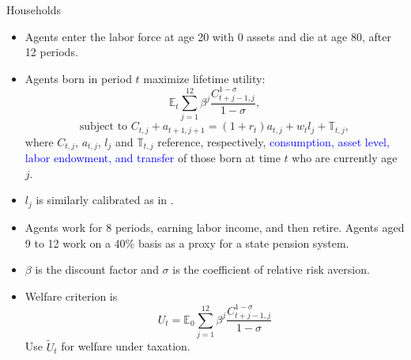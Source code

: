 \documentclass[aspectratio=1610]{beamer}
\newcommand{\blup}[1]{\textcolor{uzhgreydark}{#1}}
\let\citeOld\cite %
\renewcommand{\cite}[1]{{\blup{\citeOld{#1}}}}
\begin{document}
\begin{frame}[fragile]{Households}

\begin{footnotesize}

\begin{itemize}
    \item Agents enter the labor force at age 20 with 0 assets and die at age 80, after 12 periods. 
    \item Agents born in period $t$ maximize lifetime utility:
    \begin{equation}
 {\mathbb E}_t \sum\limits_{j = 1}^{12} \beta^j \frac{C_{t+j-1, j}^{1-\sigma}}{1-\sigma} ,
\end{equation} 
\begin{equation}
\text{subject to } C_{t,j}+a_{t+1, j+1}=(1+r_t)a_{t,j} +w_{t} l_{j} + \mathbb{T}_{t,j},
\end{equation} 
where $C_{t,j}$, $a_{t,j}$, $l_{j}$ and $\mathbb{T}_{t,j}$ reference, respectively, \textcolor{blue}{consumption, asset level, labor endowment, and transfer} of those born at time $t$ who are currently age $j$.

\item $l_{j}$ is similarly calibrated as in \cite{kotlikoff2021making}. \item Agents work for 8 periods, earning labor income, and then retire. Agents aged 9 to 12 work on a 40\% basis as a proxy for a state pension system.
\item $\beta$ is the discount factor and $\sigma$ is the coefficient of relative risk aversion.
\item Welfare criterion is 
$$ U_t= {\mathbb E}_0  \sum\limits_{j = 1}^{12} \beta^j \frac{C_{t+j-1, j}^{1-\sigma}}{1-\sigma} $$
Use $ \tilde U_t $ for welfare under taxation.
\end{itemize}

\end{footnotesize}

\end{frame}

\end{document}
